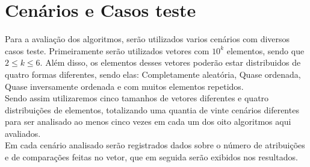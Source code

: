 \chapter{Cenários e Casos teste}
\label{chap:casos_teste}
Para a avaliação dos algoritmos, serão utilizados varios cenários com diversos casos teste.  Primeiramente serão utilizados vetores com $10^k$ elementos, sendo que $2 \leqslant k \leqslant 6$.  Além disso, os elementos desses vetores poderão estar distribuidos de quatro formas diferentes, sendo elas: Completamente aleatória, Quase ordenada, Quase inversamente ordenada e com muitos elementos repetidos.\\

Sendo assim utilizaremos cinco tamanhos de vetores diferentes e quatro distribuições de elementos, totalizando uma quantia de vinte cenários diferentes para ser analisado ao menos cinco vezes em cada um dos oito algoritmos aqui avaliados. \\

Em cada cenário analisado serão registrados dados sobre o número de atribuições e de comparações feitas no vetor, que em seguida serão exibidos nos resultados.
